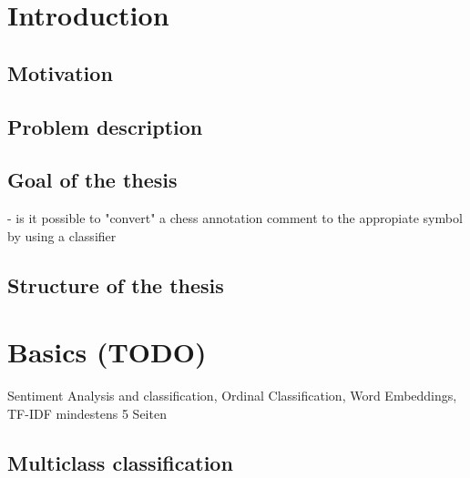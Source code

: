 \documentclass[article,type=msc,colorback,accentcolor=tud7b]{tudthesis}
\begin{document}
  \author{Florian Beck}
  \dateofexam{\today}{\today}
  \makethesistitle
  
  
  \clearpage
  
  \setcounter{tocdepth}{3}
  \tableofcontents
  \setcounter{page}{3}
  \clearpage
  
  \listoffigures
  \listoftables
  \clearpage
  
  \section{Introduction}

  \subsection{Motivation}

  \subsection{Problem description}

  \subsection{Goal of the thesis}
    - is it possible to "convert" a chess annotation comment to the appropiate symbol by using a classifier

  \subsection{Structure of the thesis}
  \clearpage
  
  \section{Basics (TODO)}
    Sentiment Analysis and classification, Ordinal Classification, Word Embeddings, TF-IDF
    mindestens 5 Seiten
  
  \subsection{Multiclass classification}
  \label{subsec:multiclass_classification}
  
\end{document}
